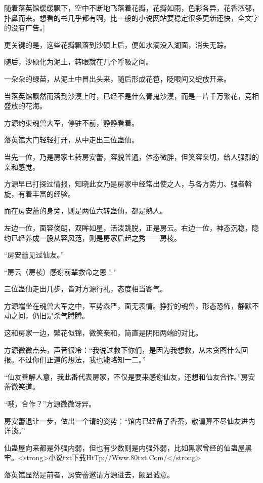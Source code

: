 
\begin{this_body}

随着落英馆缓缓飘下，空中不断地飞落着花瓣，花瓣如雨，色彩各异，花香浓郁，扑鼻而来。想看的书几乎都有啊，比一般的小说网站要稳定很多更新还快，全文字的没有广告。]

更关键的是，这些花瓣飘落到沙硕上后，便如水滴没入湖面，消失无踪。

随后，沙硕化为泥土，转眼就在几个呼吸之间。

一朵朵的绿苗，从泥土中冒出头来，随后形成花苞，眨眼间又绽放开来。

当落英馆飘然而落到沙漠上时，已经不是什么青鬼沙漠，而是一片千万繁花，竞相盛放的花海。

方源约束魂兽大军，停驻不前，静静看着。

落英馆大门轻轻打开，从中走出三位蛊仙。

当先一位，乃是房家七转房安蕾，容貌普通，体态微胖，但笑容亲切，给人强烈的亲和感觉。

方源早已打探过情报，知晓此女乃是房家中经常出使之人，与各方势力、强者斡旋，有着丰富的经验。

而在房安蕾的身旁，则是两位六转蛊仙，都是熟人。

左边一位，面容俊朗，双眸如星，活泼跳脱，正是房云。右边一位，神态沉稳，隐约已经养成一股从容风范，则是房家后起之秀――房棱。

“房安蕾见过仙友。”

“房云（房棱）感谢前辈救命之恩！”

三位蛊仙走出几步，皆对方源行礼，态度相当客气。

方源端坐在魂兽大军之中，军势森严，面无表情。狰狞的魂兽，形态恐怖，静默不动之间，仍旧是杀气腾腾。

这和房家一边，繁花似锦，微笑亲和，简直是阴阳两端的对比。

方源微微点头，声音很冷：“我说过救下你们，是因为我想救，从未贪图什么回报。不过你们正道的想法，我也能略知一二。”

“仙友善解人意，我此番代表房家，不仅是要来感谢仙友，还想和仙友合作。”房安蕾微笑道。

“哦，合作？”方源微微讶异。

房安蕾退让一步，做出一个请的姿势：“馆内已经备了香茶，敬请算不尽仙友进内详谈。”

仙蛊屋向来都是外强内弱，但也有少数则是内强外弱，比如黑家曾经的仙蛊屋黑牢。<strong>小说txt下载HtTp://Www.80txt.Com/</strong>

落英馆显然是前者，房安蕾邀请方源进去，颇显诚意。


\end{this_body}
